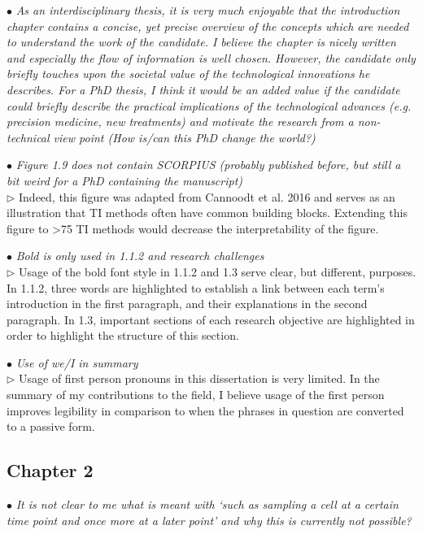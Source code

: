 \documentclass[10pt]{article}
\newcommand{\exam}[2][\  ]{\hspace{0pt}\marginpar{\color{red}#1}$\bullet$ \textit{#2}}
\newcommand{\imp}[1]{{\color{red} #1}}
\newcommand{\nimp}[1]{{\color{gray} #1}}
\newcommand{\answ}[1]{{\color{blue} $\triangleright$ #1}}
\newcommand{\bigexclaim}{\raisebox{-0.1em}{\BigTriangleUp}\hspace{-0.32em}\llap{\small\textbf{!}}\hspace{0.32em}}
\newcommand{\tagimp}{\bigexclaim}
\newcommand{\tagtime}{{\Large $\hourglass$}}
\begin{document}
{\exam[\tagimp \tagtime]{\nimp{As an interdisciplinary thesis, it is very much enjoyable that the introduction
	chapter contains a concise, yet precise overview of the concepts which are
	needed to understand the work of the candidate. I believe the chapter is nicely
	written and especially the flow of information is well chosen. However, the
	candidate only briefly touches upon the societal value of the technological
	innovations he describes. For a PhD thesis, } \imp{I think it would be an added value
	if the candidate could briefly describe the practical implications of the
	technological advances (e.g. precision medicine, new treatments) and
	motivate the research from a non-technical view point (How is/can this PhD
	change the world?)}}



\exam{Figure 1.9 does not contain SCORPIUS (probably published before,
	but still a bit weird for a PhD containing the manuscript)} \\
\answ{Indeed, this figure was adapted from Cannoodt et al. 2016 and serves as an illustration that
TI methods often have common building blocks. Extending this figure to >75 TI methods would decrease the interpretability of the figure.}

\exam{Bold is only used in 1.1.2 and research challenges} \\
\answ{Usage of the bold font style in 1.1.2 and 1.3 serve clear, but different, purposes. In 1.1.2, three words are highlighted to establish a link between each term's introduction in the first paragraph, and their explanations in the second paragraph. In 1.3, important sections of each research objective are highlighted in order to highlight the structure of this section.}

\exam{Use of we/I in summary} \\
\answ{Usage of first person pronouns in this dissertation is very limited. In the summary of my contributions to the field, I believe usage of the first person improves legibility in comparison to when the phrases in question are converted to a passive form.}



\subsection{Chapter 2}

\exam{It is not clear to me what is meant with ‘such as sampling a cell at a certain
	time point and once more at a later point’ and why this is currently not
	possible?}

}
\end{document}
